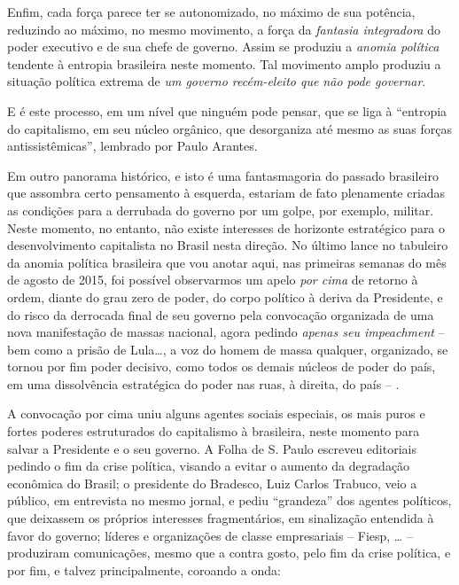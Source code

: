 Enfim, cada força parece ter se autonomizado, no máximo de sua potência,
reduzindo ao máximo, no mesmo movimento, a força da \emph{fantasia
integradora} do poder executivo e de sua chefe de governo. Assim se
produziu a \emph{anomia política} tendente à entropia brasileira neste
momento. Tal movimento amplo produziu a situação política extrema de
\emph{um governo recém-eleito que não pode governar}.

E é este processo, em um nível que ninguém pode pensar, que se liga à
``entropia do capitalismo, em seu núcleo orgânico, que desorganiza até
mesmo as suas forças antissistêmicas'', lembrado por Paulo Arantes.

Em outro panorama histórico, e isto é uma fantasmagoria do passado
brasileiro que assombra certo pensamento à esquerda, estariam de fato
plenamente criadas as condições para a derrubada do governo por um
golpe, por exemplo, militar. Neste momento, no entanto, não existe
interesses de horizonte estratégico para o desenvolvimento capitalista
no Brasil nesta direção. No último lance no tabuleiro da anomia política
brasileira que vou anotar aqui, nas primeiras semanas do mês de agosto
de 2015, foi possível observarmos um apelo \emph{por cima} de retorno à
ordem, diante do grau zero de poder, do corpo político à deriva da
Presidente, e do risco da derrocada final de seu governo pela convocação
organizada de uma nova manifestação de massas nacional, agora pedindo
\emph{apenas seu impeachment} -- bem como a prisão de Lula…, a voz do
homem de massa qualquer, organizado, se tornou por fim poder decisivo,
como todos os demais núcleos de poder do país, em uma dissolvência
estratégica do poder nas ruas, à direita, do país -- .

A convocação por cima uniu alguns agentes sociais especiais, os mais
puros e fortes poderes estruturados do capitalismo à brasileira, neste
momento para salvar a Presidente e o seu governo. A Folha de S. Paulo
escreveu editoriais pedindo o fim da crise política, visando a evitar o
aumento da degradação econômica do Brasil; o presidente do Bradesco,
Luiz Carlos Trabuco, veio a público, em entrevista no mesmo jornal, e
pediu ``grandeza'' dos agentes políticos, que deixassem os próprios
interesses fragmentários, em sinalização entendida à favor do governo;
líderes e organizações de classe empresariais -- Fiesp, … --
produziram comunicações, mesmo que a contra gosto, pelo fim da crise
política, e por fim, e talvez principalmente, coroando a onda:

